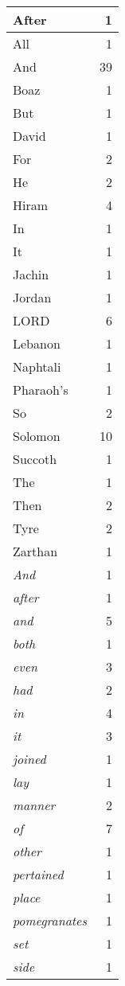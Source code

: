 \begin{center}
\begin{longtable}{l|r}
\hline \hline
\endlastfoot
After & 1 \\ \hline
All & 1 \\ \hline
And & 39 \\ \hline
Boaz & 1 \\ \hline
But & 1 \\ \hline
David & 1 \\ \hline
For & 2 \\ \hline
He & 2 \\ \hline
Hiram & 4 \\ \hline
In & 1 \\ \hline
It & 1 \\ \hline
Jachin & 1 \\ \hline
Jordan & 1 \\ \hline
LORD & 6 \\ \hline
Lebanon & 1 \\ \hline
Naphtali & 1 \\ \hline
Pharaoh's & 1 \\ \hline
So & 2 \\ \hline
Solomon & 10 \\ \hline
Succoth & 1 \\ \hline
The & 1 \\ \hline
Then & 2 \\ \hline
Tyre & 2 \\ \hline
Zarthan & 1 \\ \hline
\emph{And} & 1 \\ \hline
\emph{after} & 1 \\ \hline
\emph{and} & 5 \\ \hline
\emph{both} & 1 \\ \hline
\emph{even} & 3 \\ \hline
\emph{had} & 2 \\ \hline
\emph{in} & 4 \\ \hline
\emph{it} & 3 \\ \hline
\emph{joined} & 1 \\ \hline
\emph{lay} & 1 \\ \hline
\emph{manner} & 2 \\ \hline
\emph{of} & 7 \\ \hline
\emph{other} & 1 \\ \hline
\emph{pertained} & 1 \\ \hline
\emph{place} & 1 \\ \hline
\emph{pomegranates} & 1 \\ \hline
\emph{set} & 1 \\ \hline
\emph{side} & 1 \\ \hline

\end{longtable}
\end{center}
